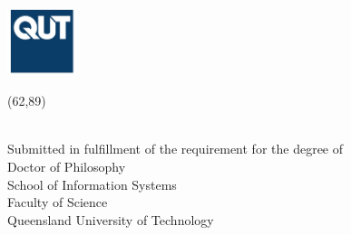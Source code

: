 \begin{titlepage}
\begin{center}
\includegraphics[height=2cm]{figures/qut_logo}\\
\large

\vspace*{10cm}

\setlength{\TPHorizModule}{1mm}
\setlength{\TPVertModule}{\TPHorizModule}
\newlength{\backupparindent}
\setlength{\backupparindent}{\parindent}
\setlength{\parindent}{0mm}			
\begin{textblock}{95}(62,89)
    \vspace*{1mm}
    \huge
    \textbf{\doctitle \\}
    \Large
    \vspace*{5mm}
    \vspace*{10mm}
    \Large
    \me\\
    \mydegrees
\end{textblock}


\vfill
\version %

\vfill
\large Submitted in fulfillment of the requirement for the degree of \\
     Doctor of Philosophy \\
\large
\vfill
School of Information Systems  \\
Faculty of Science\\
Queensland University of Technology\\
\the\year{}\\

\setlength{\parindent}{\backupparindent}
\end{center}
\end{titlepage} 